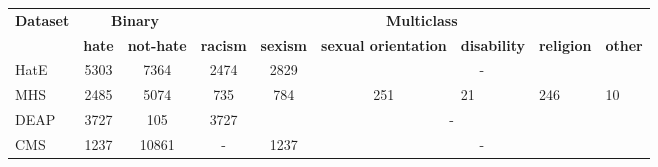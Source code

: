 \begin{table}[ht]
\centering
\begin{adjustbox}{width=\textwidth,center}
\begin{tabular}{|l|cc|ccclll|}
\hline
\multicolumn{1}{|c|}{\multirow{2}{*}{\textbf{Dataset}}} & \multicolumn{2}{c|}{\textbf{Binary}}                     & \multicolumn{6}{c|}{\textbf{Multiclass}}                                                                                                                                                                                                                  \\ \cline{2-9} 
\multicolumn{1}{|c|}{}                                  & \multicolumn{1}{c|}{\textbf{hate}}   & \textbf{not-hate} & \multicolumn{1}{c|}{\textbf{racism}} & \multicolumn{1}{c|}{\textbf{sexism}} & \multicolumn{1}{c|}{\textbf{sexual orientation}} & \multicolumn{1}{c|}{\textbf{disability}} & \multicolumn{1}{c|}{\textbf{religion}} & \multicolumn{1}{c|}{\textbf{other}} \\ \hline
HatE                                                       & \multicolumn{1}{c|}{5303}            & 7364              & \multicolumn{1}{c|}{2474}            & \multicolumn{1}{c|}{2829}            & \multicolumn{4}{c|}{-}                                                                                                                                                      \\ \hline
MHS                                                       & \multicolumn{1}{c|}{2485}            &    5074           & \multicolumn{1}{c|}{735}             & \multicolumn{1}{c|}{784}             & \multicolumn{1}{c|}{251}                          & \multicolumn{1}{l|}{21}                  & \multicolumn{1}{l|}{246}               & 10                                  \\ \hline
DEAP                                                       & \multicolumn{1}{c|}{3727}            & 105               & \multicolumn{1}{c|}{3727}            & \multicolumn{5}{c|}{-}                                                                                                                                                                                             \\ \hline
CMS                                                       & \multicolumn{1}{c|}{1237}            & 10861             & \multicolumn{1}{c|}{-}               & \multicolumn{1}{c|}{1237}            & \multicolumn{4}{c|}{-}                                                                                                                                                      \\ \hline

\end{tabular}
\end{adjustbox}
\end{table}
